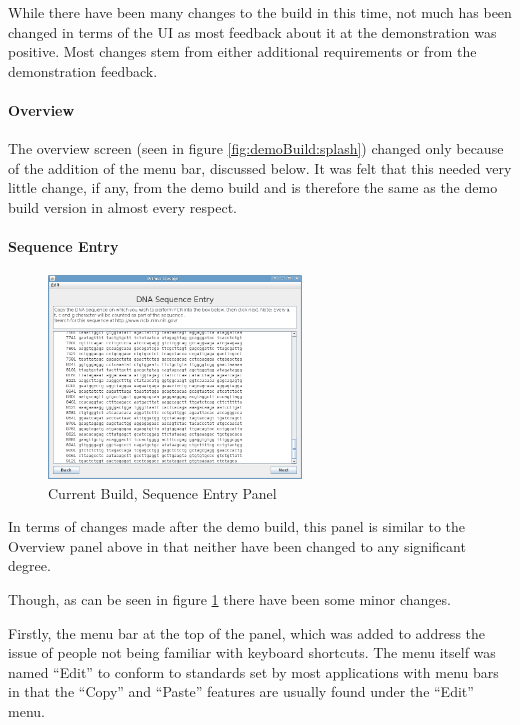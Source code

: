 While there have been many changes to the build in this time, not much
has been changed in terms of the UI as most feedback about it at the
demonstration was positive.
Most changes stem from either additional requirements or from the
demonstration feedback.

\paragraph{Overview}
The overview screen (seen in figure \ref{fig:demoBuild:splash})
changed only because of the addition of the menu bar, discussed
below.
It was felt that this needed very little change, if any, from the demo
build and is therefore the same as the demo build version in almost
every respect.

\paragraph{Sequence Entry}

\begin{figure}[h]
  \begin{center}
    \includegraphics[width=0.6\textwidth]{./images/currentBuild/sequenceEntry.png}
    \caption{
      \label{fig:currentBuild:sequenceEntry}
      Current Build, Sequence Entry Panel
    }
  \end{center}
\end{figure}

In terms of changes made after the demo build, this panel is similar
to the Overview panel above in that neither have been changed to any
significant degree.

Though, as can be seen in figure \ref{fig:currentBuild:sequenceEntry}
there have been some minor changes.

Firstly, the menu bar at the top of the panel, which was added to
address the issue of people not being familiar with keyboard
shortcuts.
The menu itself was named ``Edit'' to conform to standards set by most
applications with menu bars in that the ``Copy'' and ``Paste''
features are usually found under the ``Edit'' menu.

